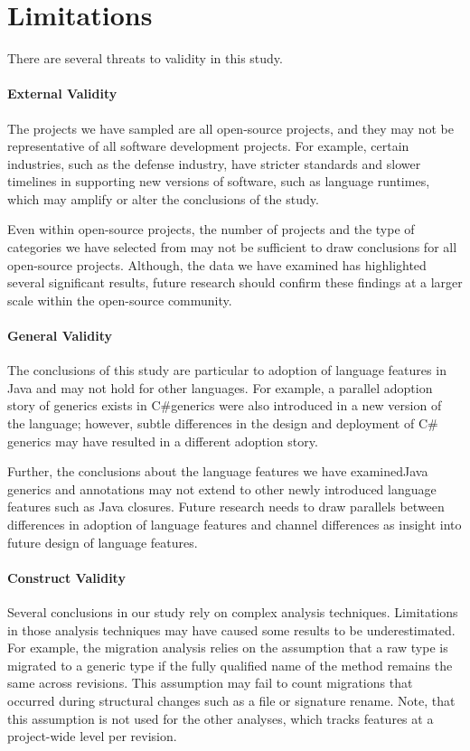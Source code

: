 \documentclass{svjour3}
\begin{document}
\section{Limitations}\label{sec:limitations}

There are several threats to validity in this study.

\paragraph{External Validity}
The projects we have sampled are all open-source projects, and they may not be representative of all software development projects.
For example, certain industries, such as the defense industry, 
have stricter standards and slower timelines in supporting new versions of software, such as language runtimes, 
which may amplify or alter the conclusions of the study.

Even within open-source projects, the number of projects and the type of categories we have selected from 
may not be sufficient to draw conclusions for all open-source projects.  Although, the data we have examined 
has highlighted several significant results, future research should confirm these findings at a larger scale within the open-source community.

\paragraph{General Validity}
The conclusions of this study are particular to adoption of language features in Java and may not hold for other languages.
For example, a parallel adoption story of generics exists in C\#\textemdash generics were also introduced in a new version of the language; 
however, subtle differences in the design and deployment of C\# generics may have resulted in a different adoption story.

Further, the conclusions about the language features we have examined\textemdash Java generics and annotations\textemdash 
may not extend to other newly introduced language features such as Java closures.  
Future research needs to draw parallels between differences in adoption of language features 
and channel differences as insight into future design of language features.

\paragraph{Construct Validity}
Several conclusions in our study rely on complex analysis techniques.
Limitations in those analysis techniques may have caused some results to be underestimated.
For example, the migration analysis relies on the assumption that a raw type is migrated to a generic type if the fully qualified name of the method remains the same across revisions.
This assumption may fail to count migrations that occurred during structural changes such as a file or signature rename.
Note, that this assumption is not used for the other analyses, which tracks features at a project-wide level per revision.
\end{document}
